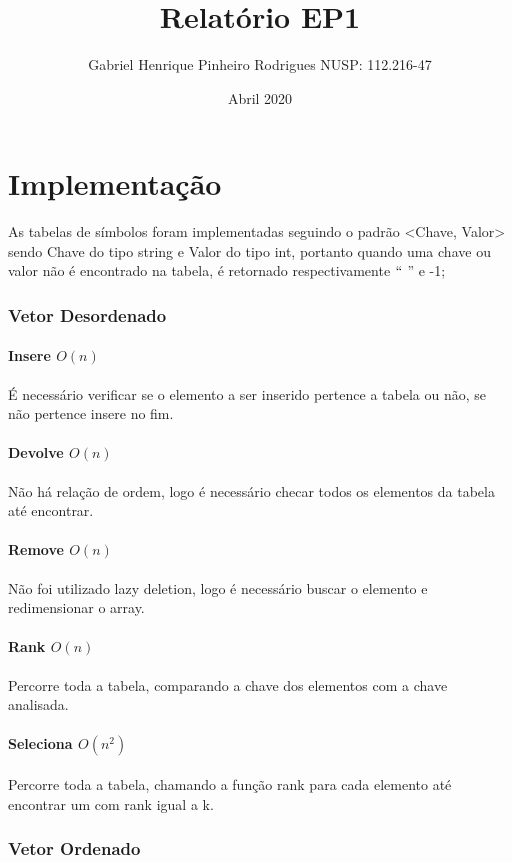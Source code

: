 \documentclass[14pt]{article}
\title{Relatório EP1}
\author{Gabriel Henrique Pinheiro Rodrigues NUSP: 112.216-47}
\date{Abril 2020}
\begin{document}
\maketitle
{\fontsize{13}{16} \selectfont 


\part{Implementação}   
As tabelas de símbolos foram implementadas seguindo o padrão <Chave, Valor> sendo Chave do tipo 
string e Valor do tipo int, portanto quando uma chave ou valor não é encontrado na tabela, é retornado
respectivamente $``$ '' e -1;

\section{Vetor Desordenado}

\subsection{Insere $O(n)$} 
É necessário verificar se o elemento a ser inserido pertence a tabela ou não, se não pertence insere no fim.
\subsection{Devolve $O(n)$}
Não há relação de ordem, logo é necessário checar todos os elementos da tabela até encontrar.
\subsection{Remove $O(n)$}
Não foi utilizado lazy deletion, logo é necessário buscar o elemento e redimensionar o array.
\subsection{Rank $O(n)$}
Percorre toda a tabela, comparando a chave dos elementos com a chave analisada.
\subsection{Seleciona $O(n^2)$}
Percorre toda a tabela, chamando a função rank para cada elemento até encontrar um com rank igual a k.
\\

\section{Vetor Ordenado}

}
\end{document}
